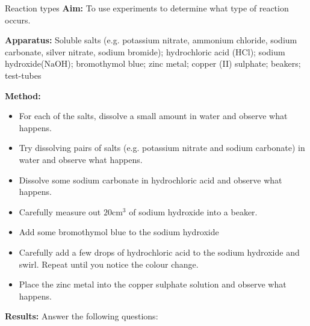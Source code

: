             \begin{g_experiment}{Reaction types}
            \nopagebreak
            \label{m38719*eip-190}\noindent{}\textbf{Aim: }\newline
    To use experiments to determine what type of reaction occurs.
\par 
\label{m38719*eip-1901}\noindent{}\textbf{Apparatus: }\newline
    Soluble salts (e.g. potassium nitrate, ammonium chloride, sodium carbonate, silver nitrate, sodium bromide); hydrochloric acid ($\mathrm{HCl}$); sodium hydroxide($\mathrm{NaOH}$); bromothymol blue; zinc metal; copper (II) sulphate; beakers; test-tubes
\par 
\label{m38719*eip-1902}\noindent{}\textbf{Method: }\label{m38719*id6231}\begin{itemize}[noitemsep]
            \item For each of the salts, dissolve a small amount in water and observe what happens.\item Try dissolving pairs of salts (e.g. potassium nitrate and sodium carbonate) in water and observe what happens.\item Dissolve some sodium carbonate in hydrochloric acid and observe what happens.\item Carefully measure out $20{\mathrm{cm}}^{3}$ of sodium hydroxide into a beaker. \item Add some bromothymol blue to the sodium hydroxide\item Carefully add a few drops of hydrochloric acid to the sodium hydroxide and swirl. Repeat until you notice the colour change.\item Place the zinc metal into the copper sulphate solution and observe what happens.\end{itemize}
\par 
\label{m38719*eip-1903}\noindent{}\textbf{Results: }\newline
    Answer the following questions:
\label{m38719*id6144}\begin{itemize}[noitemsep]

\end{itemize}
\end{g_experiment}
